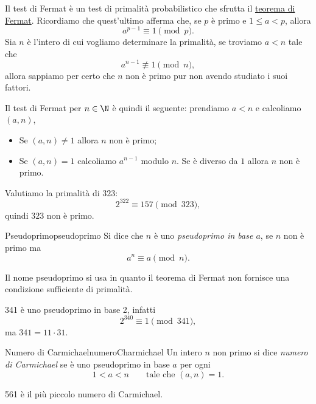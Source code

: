 	Il test di Fermat è un test di primalità probabilistico che sfrutta il \hyperref[th:teoremaEuleroFermat]{teorema di Fermat}. Ricordiamo che quest'ultimo afferma che, se \(p\) è primo e \(1\le a <p\), allora
		\[
		a^{p-1} \equiv  1 \pmod{p}.
		\]
	Sia \(n\) è l'intero di cui vogliamo determinare la primalità, se troviamo \(a < n\) tale che
		\[
		a^{n-1} \not\equiv 1 \pmod{n},
		\]
	allora sappiamo per certo che \(n\) non è primo pur non avendo studiato i suoi fattori.

	Il test di Fermat per \(n\in\N\) è quindi il seguente:
	prendiamo \(a<n\) e calcoliamo \((a,n)\),
	\begin{itemize}
		\item Se \((a,n)\neq 1\) allora \(n\) non è primo;
		\item Se \((a,n)=1\) calcoliamo \(a^{n-1}\) modulo \(n\). Se è diverso da \(1\) allora \(n\) non è primo. 
	\end{itemize}

	\begin{ese}
	Valutiamo la primalità di \(323\):
		\[
		2^{322} \equiv 157 \pmod{323},
		\]
	quindi \(323\) non è primo.
	\end{ese}
%
%
	\begin{defn}{Pseudoprimo}{pseudoprimo}
	Si dice che \(n\) è uno \emph{pseudoprimo in base \(a\)}, se \(n\) non è primo ma
		\[
		a^n \equiv a \pmod{n}.
		\]
	\end{defn}

	\begin{oss}
	Il nome pseudoprimo si usa in quanto il teorema di Fermat non fornisce una condizione sufficiente di primalità.
	\end{oss}

	\begin{ese}
	341 è uno pseudoprimo in base 2, infatti
		\[
		2^{340} \equiv 1 \pmod{341},
		\]
	ma \(341=11\cdot 31\).
	\end{ese}

	\begin{defn}{Numero di Carmichael}{numeroCharmichael}
	Un intero \(n\) non primo si dice \emph{numero di Carmichael} se è uno pseudoprimo in base \(a\) per ogni
		\[
		1 < a < n \qquad\text{tale che } (a,n) = 1.
		\]
	\end{defn}

	\begin{ese}
	561 è il più piccolo numero di Carmichael.
	\end{ese}

